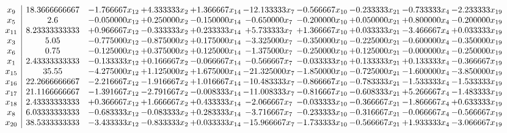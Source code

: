 \documentclass[10pt]{article}
\begin{document}
 \[\begin{array}{c| c c@{\hskip 2pt} c@{\hskip 2pt} c@{\hskip 2pt} c@{\hskip 2pt} c@{\hskip 2pt} c@{\hskip 2pt} c@{\hskip 2pt} c@{\hskip 2pt} }
 x_{9}   &  18.3666666667 & -1.766667 x_{12} & + 4.333333 x_{2} & + 1.366667 x_{14} & -12.133333 x_{7} & -0.566667 x_{10} & -0.233333 x_{21} & -0.733333 x_{4} & -2.233333 x_{19}\\
 x_{5}   &  2.6 & -0.050000 x_{12} & + 0.250000 x_{2} & -0.150000 x_{14} & -0.650000 x_{7} & -0.200000 x_{10} & + 0.050000 x_{21} & + 0.800000 x_{4} & -0.200000 x_{19}\\
 x_{11}   &  8.23333333333 & + 0.966667 x_{12} & -0.333333 x_{2} & + 0.233333 x_{14} & + 5.733333 x_{7} & + 1.366667 x_{10} & + 0.033333 x_{21} & -3.466667 x_{4} & + 0.033333 x_{19}\\
 x_{3}   &  5.05 & -0.775000 x_{12} & -0.875000 x_{2} & + 0.175000 x_{14} & -3.325000 x_{7} & -0.350000 x_{10} & -0.225000 x_{21} & -0.600000 x_{4} & -0.350000 x_{19}\\
 x_{6}   &  0.75 & -0.125000 x_{12} & + 0.375000 x_{2} & + 0.125000 x_{14} & -1.375000 x_{7} & -0.250000 x_{10} & + 0.125000 x_{21} & -0.000000 x_{4} & -0.250000 x_{19}\\
 x_{1}   &  2.43333333333 & -0.133333 x_{12} & + 0.166667 x_{2} & -0.066667 x_{14} & -0.566667 x_{7} & -0.033333 x_{10} & + 0.133333 x_{21} & + 0.133333 x_{4} & -0.366667 x_{19}\\
 x_{15}   &  35.55 & -4.275000 x_{12} & + 1.125000 x_{2} & + 1.675000 x_{14} & -21.325000 x_{7} & -1.850000 x_{10} & -0.725000 x_{21} & -1.600000 x_{4} & -3.850000 x_{19}\\
 x_{16}   &  22.2666666667 & -2.216667 x_{12} & -1.916667 x_{2} & + 1.016667 x_{14} & -10.483333 x_{7} & -0.866667 x_{10} & -0.783333 x_{21} & -1.533333 x_{4} & -1.533333 x_{19}\\
 x_{17}   &  21.1166666667 & -1.391667 x_{12} & -2.791667 x_{2} & -0.008333 x_{14} & -11.008333 x_{7} & -0.816667 x_{10} & -0.608333 x_{21} & + 5.266667 x_{4} & -1.483333 x_{19}\\
 x_{18}   &  2.43333333333 & + 0.366667 x_{12} & + 1.666667 x_{2} & + 0.433333 x_{14} & -2.066667 x_{7} & -0.033333 x_{10} & -0.366667 x_{21} & -1.866667 x_{4} & + 0.633333 x_{19}\\
 x_{8}   &  6.03333333333 & -0.683333 x_{12} & -0.083333 x_{2} & + 0.283333 x_{14} & -3.716667 x_{7} & -0.233333 x_{10} & -0.316667 x_{21} & -0.066667 x_{4} & -0.566667 x_{19}\\
 x_{20}   &  38.5333333333 & -3.433333 x_{12} & -0.833333 x_{2} & + 0.033333 x_{14} & -15.966667 x_{7} & -1.733333 x_{10} & -0.566667 x_{21} & + 1.933333 x_{4} & -3.066667 x_{19}\\

\end{array}\]
\end{document}
